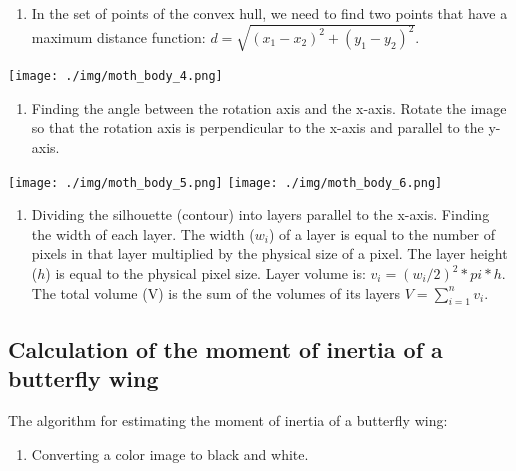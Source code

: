 \documentclass[
]{article}
\providecommand{\tightlist}{%
  \setlength{\itemsep}{0pt}\setlength{\parskip}{0pt}}
\let\origfigure\figure
\let\endorigfigure\endfigure
\renewenvironment{figure}[1][2] {
    \expandafter\origfigure\expandafter[H]
} {
    \endorigfigure
}
\begin{document}
\begin{enumerate}
\def\labelenumi{\arabic{enumi}.}
\setcounter{enumi}{2}
\tightlist
\item
  In the set of points of the convex hull, we need to find two points
  that have a maximum distance function:
  \(d = \sqrt{(x_1-x_2)^2 + (y_1-y_2)^2}\).
\end{enumerate}

\begin{figure}
\centering
\texttt{[image: ./img/moth\_body\_4.png]}
\caption{Axis of rotation}
\end{figure}

\begin{enumerate}
\def\labelenumi{\arabic{enumi}.}
\setcounter{enumi}{3}
\tightlist
\item
  Finding the angle between the rotation axis and the x-axis. Rotate the
  image so that the rotation axis is perpendicular to the x-axis and
  parallel to the y-axis.
\end{enumerate}

\texttt{[image: ./img/moth\_body\_5.png]}
\texttt{[image: ./img/moth\_body\_6.png]}

\begin{enumerate}
\def\labelenumi{\arabic{enumi}.}
\setcounter{enumi}{4}
\tightlist
\item
  Dividing the silhouette (contour) into layers parallel to the x-axis.
  Finding the width of each layer. The width (\(w_i\)) of a layer is
  equal to the number of pixels in that layer multiplied by the physical
  size of a pixel. The layer height (\(h\)) is equal to the physical
  pixel size. Layer volume is: \(v_i = (w_i / 2) ^2 * pi * h\). The
  total volume (V) is the sum of the volumes of its layers
  \(V = \sum_{i=1}^{n} v_i\).
\end{enumerate}

\hypertarget{calculation-of-the-moment-of-inertia-of-a-butterfly-wing}{%
\subsection{Calculation of the moment of inertia of a butterfly
wing}\label{calculation-of-the-moment-of-inertia-of-a-butterfly-wing}}

The algorithm for estimating the moment of inertia of a butterfly wing:

\begin{enumerate}
\def\labelenumi{\arabic{enumi}.}
\tightlist
\item
  Converting a color image to black and white.
\end{enumerate}
\end{document}
